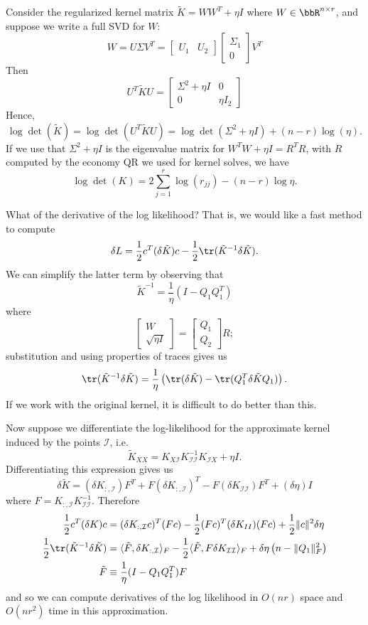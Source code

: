 \documentclass[12pt, leqno]{article} %
\newcommand{\calI}{\mathcal{I}}
\begin{document}
Consider the regularized kernel matrix $\tilde{K} = WW^T + \eta I$ where
$W \in \bbR^{n \times r}$, and suppose we write a full SVD for $W$:
\[
  W = U \Sigma V^T =
    \begin{bmatrix} U_1 & U_2 \end{bmatrix}
    \begin{bmatrix} \Sigma_1 \\ 0 \end{bmatrix}
    V^T
\]
Then
\[
  U^T \tilde{K} U = \begin{bmatrix} \Sigma^2 + \eta I & 0 \\ 0 & \eta I_2 \end{bmatrix}
\]
Hence,
\[
  \log \det(\tilde{K}) = \log \det(U^T \tilde{K} U) =
  \log \det(\Sigma^2 + \eta I) + (n-r) \log(\eta).
\]
If we use that $\Sigma^2 + \eta I$ is the eigenvalue matrix
for $W^T W + \eta I = R^T R$, with $R$ computed by the economy QR
we used for kernel solves, we have
\[
  \log \det(K) = 2 \sum_{j=1}^r \log(r_{jj}) - (n-r) \log \eta.
\]

What of the derivative of the log likelihood?  That is, we would like
a fast method to compute
\[
  \delta L = \frac{1}{2} c^T (\delta \tilde{K}) c -
             \frac{1}{2} \tr(\tilde{K}^{-1} \delta \tilde{K}).
\]
We can simplify the latter term by observing that
\[
  \tilde{K}^{-1} = \frac{1}{\eta} (I - Q_1 Q_1^T)
\]
where
\[
  \begin{bmatrix} W \\ \sqrt{\eta I} \end{bmatrix} =
  \begin{bmatrix} Q_1 \\ Q_2 \end{bmatrix} R;
\]
substitution and using properties of traces gives us
\[
  \tr(\tilde{K}^{-1} \delta \tilde{K}) =
    \frac{1}{\eta} \left( \tr(\delta \tilde{K}) -
    \tr(Q_1^T \delta \tilde{K} Q_1) \right).
\]
If we work with the original kernel, it is difficult to do better
than this.

Now suppose we differentiate the log-likelihood for the approximate
kernel induced by the points $\calI$, i.e.
\[
  \tilde{K}_{XX} = K_{X \calI} K_{\calI \calI}^{-1} K_{\calI X} + \eta I.
\]
Differentiating this expression gives us
\[
  \delta \tilde{K} =
    (\delta K_{:,\calI}) F^T + F (\delta K_{:,\calI})^T -
    F (\delta K_{\calI \calI}) F^T + (\delta \eta) I
\]
where $F = K_{:,\calI} K_{\calI \calI}^{-1}$.  Therefore
\begin{align*}
  \frac{1}{2} c^T (\delta K) c &=
  (\delta K_{:,\calI} c)^T (Fc)
  - \frac{1}{2} (Fc)^T (\delta K_{II}) (Fc) +
  \frac{1}{2} \|c\|^2 \delta \eta \\
  \frac{1}{2} \tr(\tilde{K}^{-1} \delta \tilde{K}) &=
    \langle \tilde{F}, \delta K_{:,\calI} \rangle_F -
    \frac{1}{2} \langle \tilde{F}, F \delta K_{\calI \calI} \rangle_F
    + \delta \eta \left( n - \|Q_1\|_F^2 \right) \\
  \tilde{F} &\equiv \frac{1}{\eta} (I-Q_1 Q_1^T) F
\end{align*}
and so we can compute derivatives of the log likelihood in $O(nr)$ space
and $O(nr^2)$ time in this approximation.
\end{document}
